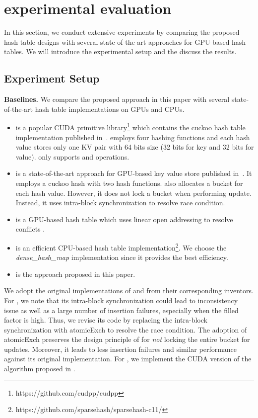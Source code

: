 \section{experimental evaluation}\label{sec:exp}
In this section, we conduct extensive experiments by comparing the proposed hash table designs with several state-of-the-art approaches for GPU-based hash tables. 
We will introduce the experimental setup and the discuss the results. 

\subsection{Experiment Setup}\label{sec:exp:setup}

\vspace{1mm}\noindent\textbf{Baselines.} We compare the proposed approach in this paper with several state-of-the-art hash table implementations on GPUs and CPUs. 
\begin{itemize}
	\item \cudpp is a popular CUDA primitive library\footnote{https://github.com/cudpp/cudpp} which contains the cuckoo hash table implementation published in~\cite{alcantara2009real}. 
	\cudpp employs four hashing functions and each hash value stores only one KV pair with 64 bits size (32 bits for key and 32 bits for value). 
	\cudpp only supports  and  operations. 
	\item \megakv is a state-of-the-art approach for GPU-based key value store published in~\cite{zhang2015mega}. It employs a cuckoo hash with two hash functions.
	\megakv also allocates a bucket for each hash value. However, it does not lock a bucket when performing update. Instead, it uses intra-block synchronization to resolve race condition. 
	\item \linear is a GPU-based hash table which uses linear open addressing to resolve conflicts \cite{hong2010mapcg}. 
	\item \google is an efficient CPU-based hash table implementation\footnote{https://github.com/sparsehash/sparsehash-c11/}. We choose the \emph{dense\_hash\_map} implementation since it provides the best efficiency.
	\item \voter is the approach proposed in this paper.
\end{itemize}
We adopt the original implementations of \cudpp and \google from their corresponding inventors. 
For \megakv, we note that its intra-block synchronization could lead to inconsistency issue as well as a large number of insertion failures, especially when the filled factor is high.  
Thus, we revise its code by replacing the intra-block synchronization with atomicExch to resolve the race condition. The adoption of atomicExch preserves the design principle of \megakv for \emph{not} locking the entire bucket for updates. Moreover, it leads to less insertion failures and similar performance against its original implementation. 
For \linear, we implement the CUDA version of the algorithm proposed in \cite{hong2010mapcg}.

